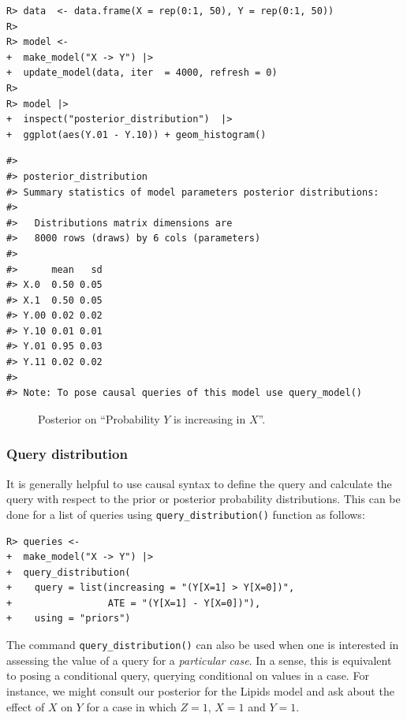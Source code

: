 \documentclass[
  11pt,
  article]{jss}
\begin{document}
\begin{verbatim}
R> data  <- data.frame(X = rep(0:1, 50), Y = rep(0:1, 50))
R> 
R> model <- 
+  make_model("X -> Y") |>
+  update_model(data, iter  = 4000, refresh = 0)
R> 
R> model |> 
+  inspect("posterior_distribution")  |> 
+  ggplot(aes(Y.01 - Y.10)) + geom_histogram() 
\end{verbatim}

\begin{verbatim}
#> 
#> posterior_distribution
#> Summary statistics of model parameters posterior distributions:
#> 
#>   Distributions matrix dimensions are 
#>   8000 rows (draws) by 6 cols (parameters)
#> 
#>      mean   sd
#> X.0  0.50 0.05
#> X.1  0.50 0.05
#> Y.00 0.02 0.02
#> Y.10 0.01 0.01
#> Y.01 0.95 0.03
#> Y.11 0.02 0.02
#> 
#> Note: To pose causal queries of this model use query_model()
\end{verbatim}

\begin{figure}[t]


\caption{\label{fig-posterior-dist}Posterior on ``Probability \(Y\) is
increasing in \(X\)''.}

\end{figure}%

\FloatBarrier

\subsubsection{Query distribution}\label{query-distribution}

It is generally helpful to use causal syntax to define the query and
calculate the query with respect to the prior or posterior probability
distributions. This can be done for a list of queries using
\texttt{query\_distribution()} function as follows:

\begin{verbatim}
R> queries <- 
+  make_model("X -> Y") |> 
+  query_distribution(
+    query = list(increasing = "(Y[X=1] > Y[X=0])",
+                 ATE = "(Y[X=1] - Y[X=0])"), 
+    using = "priors")
\end{verbatim}

The command \texttt{query\_distribution()} can also be used when one is
interested in assessing the value of a query for a \emph{particular
case}. In a sense, this is equivalent to posing a conditional query,
querying conditional on values in a case. For instance, we might consult
our posterior for the Lipids model and ask about the effect of \(X\) on
\(Y\) for a case in which \(Z=1\), \(X=1\) and \(Y=1\).
\end{document}
